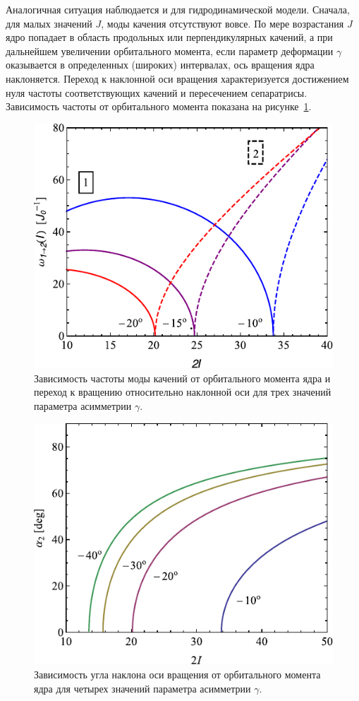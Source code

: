 \documentclass[a4paper, 10pt, twocolumn]{article}
\begin{document}
Аналогичная ситуация наблюдается и для гидродинамической модели. 
Сначала, для малых значений $J$, моды качения отсутствуют вовсе. По мере 
возрастания $J$ ядро попадает в область продольных или перпендикулярных 
качений, а при дальнейшем увеличении орбитального момента, если параметр 
деформации $\gamma$ оказывается в определенных (широких) интервалах, ось 
вращения ядра наклоняется. Переход к наклонной оси вращения 
характеризуется достижением нуля частоты соответствующих качений 
и пересечением сепаратрисы. Зависимость частоты от орбитального момента 
показана на рисунке~\ref{fig:transition}.

\begin{figure}%
	\centering
	\includegraphics[width=.8\linewidth]{figures/wobb-tilted-transition}
	\caption{Зависимость частоты моды качений от орбитального момента ядра 
	и переход к вращению относительно наклонной оси для трех значений 
	параметра асимметрии $\gamma$.}
	\label{fig:transition}
\end{figure}%
\begin{figure}%
	\centering
	\includegraphics[width=.8\linewidth]{figures/tilted-alpha-evolution}
	\caption{Зависимость угла наклона оси вращения от орбитального момента 
	ядра для четырех значений параметра асимметрии $\gamma$.}
	\label{fig:alpha-evo}
\end{figure}%
\end{document}
